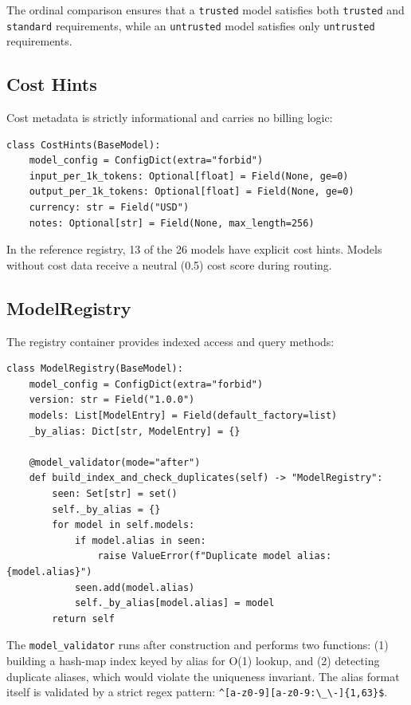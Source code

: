 \documentclass[11pt,a4paper]{article}
\theoremstyle{plain}
\theoremstyle{definition}
\begin{document}
The ordinal comparison ensures that a \texttt{trusted} model satisfies both
\texttt{trusted} and \texttt{standard} requirements, while an
\texttt{untrusted} model satisfies only \texttt{untrusted} requirements.

\subsection{Cost Hints}

Cost metadata is strictly informational and carries no billing logic:

\begin{lstlisting}[style=pythonstyle, caption={CostHints schema from \texttt{schema.py}}]
class CostHints(BaseModel):
    model_config = ConfigDict(extra="forbid")
    input_per_1k_tokens: Optional[float] = Field(None, ge=0)
    output_per_1k_tokens: Optional[float] = Field(None, ge=0)
    currency: str = Field("USD")
    notes: Optional[str] = Field(None, max_length=256)
\end{lstlisting}

In the reference registry, 13 of the 26 models have explicit cost hints. Models
without cost data receive a neutral (0.5) cost score during routing.

\subsection{ModelRegistry}

The registry container provides indexed access and query methods:

\begin{lstlisting}[style=pythonstyle, caption={ModelRegistry from \texttt{schema.py}}]
class ModelRegistry(BaseModel):
    model_config = ConfigDict(extra="forbid")
    version: str = Field("1.0.0")
    models: List[ModelEntry] = Field(default_factory=list)
    _by_alias: Dict[str, ModelEntry] = {}

    @model_validator(mode="after")
    def build_index_and_check_duplicates(self) -> "ModelRegistry":
        seen: Set[str] = set()
        self._by_alias = {}
        for model in self.models:
            if model.alias in seen:
                raise ValueError(f"Duplicate model alias: {model.alias}")
            seen.add(model.alias)
            self._by_alias[model.alias] = model
        return self
\end{lstlisting}

The \texttt{model\_validator} runs after construction and performs two functions:
(1) building a hash-map index keyed by alias for O(1) lookup, and (2) detecting
duplicate aliases, which would violate the uniqueness invariant. The alias format
itself is validated by a strict regex pattern:
\texttt{\^{}[a-z0-9][a-z0-9:\textbackslash\_\textbackslash{}-]\{1,63\}\$}.
\end{document}
